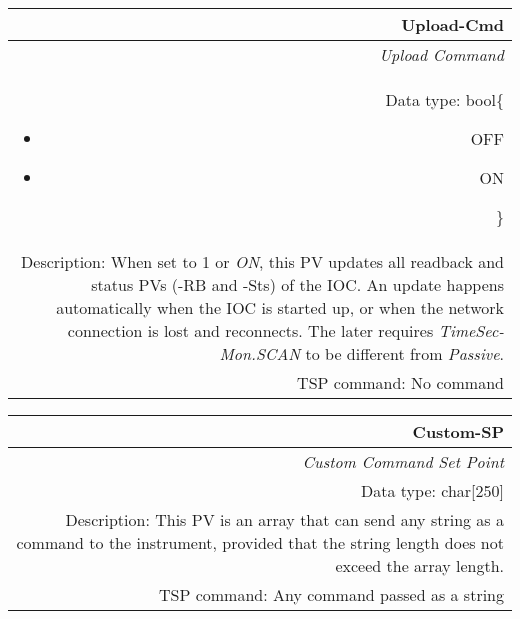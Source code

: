 \documentclass[openany]{article}
\begin{document}
		\begin{tabular}{N}
			\hline
			\bfseries Upload-Cmd\label{pv:upload-cmd} \\ \hline
			\emph{Upload Command} \\
			Data type: bool\{\begin{itemize}[noitemsep]
				\small
				\item[] OFF
				\item[] ON
			\end{itemize}\} \\
			Description: When set to 1 or \emph{ON}, this PV updates all readback and status PVs (-RB and -Sts) of the IOC. An update happens automatically when the IOC is started up, or when the network connection is lost and reconnects. The later requires \emph{TimeSec-Mon.SCAN} to be different from \emph{Passive}. \\
			TSP command: No command
		\end{tabular}

		\begin{tabular}{N}
			\hline
			\bfseries Custom-SP\label{pv:custom-sp} \\ \hline
			\emph{Custom Command Set Point} \\
			Data type: char[250] \\
			Description: This PV is an array that can send any string as a command to the instrument, provided that the string length does not exceed the array length. \\
			TSP command: Any command passed as a string
		\end{tabular}
\end{document}
